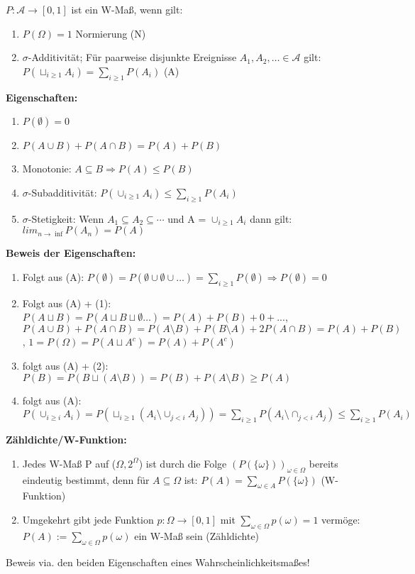 \documentclass[a4paper,11pt]{scrartcl}
\begin{document}
$P : \mathcal{A} \rightarrow [0,1]$ ist ein W-Maß, wenn gilt:
\begin{enumerate}
    \item $P(\Omega) = 1$ Normierung (N)
    \item $\sigma$-Additivität; Für paarweise disjunkte Ereignisse $A_1,A_2, \dots \in \mathcal{A}$ gilt:
    $P(\sqcup_{i \geq 1} A_i) = \sum_{i \geq 1} P(A_i)$ (A)
\end{enumerate}

\textbf{Eigenschaften:}
\begin{enumerate}
    \item $P(\emptyset) = 0$
    \item $P(A \cup B) + P(A \cap B) = P(A) + P(B)$
    \item Monotonie: $A \subseteq B \Rightarrow P(A) \leq P(B)$
    \item $\sigma$-Subadditivität: $P(\cup_{i \geq 1} A_i) \leq \sum_{i \geq 1} P(A_i)$
    \item $\sigma$-Stetigkeit: Wenn $A_1 \subseteq A_2 \subseteq \cdots$ und A = $\cup_{i \geq 1} A_i$ dann gilt: $lim_{n \rightarrow \inf} P(A_n) = P(A)$
\end{enumerate}

\textbf{Beweis der Eigenschaften:} %
\begin{enumerate}
    \item Folgt aus (A): $P(\emptyset) = P(\emptyset \cup \emptyset \cup \dots) = \sum_{i \geq 1} P(\emptyset) \Rightarrow P(\emptyset) = 0$
    \item Folgt aus (A) + (1): $P(A \sqcup B) = P(A \sqcup B \sqcup \emptyset \dots) = P(A) + P(B) + 0 +...$,
    $P(A \cup B) + P(A \cap B) = P(A \setminus B) + P(B \setminus A) + 2P(A \cap B) = P(A) + P(B)$, $1 = P(\Omega) = P(A \sqcup A^c) = P(A) + P(A^c)$
    \item folgt aus (A) + (2): $P(B) = P(B \sqcup (A \setminus B)) = P(B) + P(A \setminus B) \geq P(A)$
    \item folgt aus (A): $P(\cup_{i \geq i} A_i) = P(\sqcup_{i \geq 1} (A_i \setminus \cup_{j < i} A_j)) = \sum_{i \geq 1}P(A_i \setminus \cap_{j < i} A_j) \leq \sum_{i \geq 1 } P(A_i)$
\end{enumerate}

\textbf{Zähldichte/W-Funktion:}
\begin{enumerate}
    \item Jedes W-Maß P auf ($\Omega,2^\Omega$) ist durch die Folge $(P(\{\omega\}))_{\omega \in \Omega}$ bereits eindeutig bestimmt, denn für $A \subseteq \Omega$ ist:
    $P(A) = \sum_{\omega \in A} P(\{\omega\})$ (W-Funktion)
\item Umgekehrt gibt jede Funktion $p: \Omega \rightarrow [0,1] $ mit $\sum_{\omega \in \Omega} p(\omega) = 1$ vermöge: $P(A) := \sum_{\omega \in \Omega} p(\omega)$ ein W-Maß sein (Zähldichte)
\end{enumerate}
Beweis via. den beiden Eigenschaften eines Wahrscheinlichkeitsmaßes!
\end{document}
